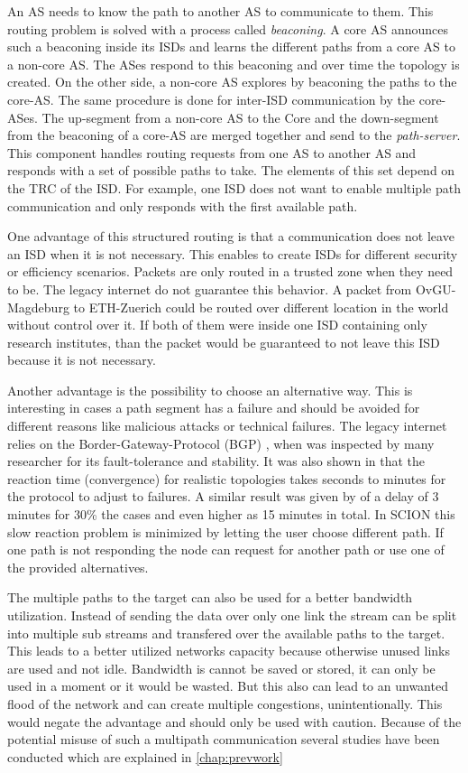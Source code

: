 \documentclass[thesis.tex]{subfiles}
\begin{document}
An AS needs to know the path to another AS to communicate to them. This routing problem is solved with a process called \textit{beaconing}. A core AS announces such a beaconing inside its ISDs and learns the different paths from a core AS to a non-core AS. The ASes respond to this beaconing and over time the topology is created. On the other side, a non-core AS explores by beaconing the paths to the core-AS. The same procedure is done for inter-ISD communication by the core-ASes. The up-segment from a non-core AS to the Core and the down-segment from the beaconing of a core-AS are merged together and send to the \textit{path-server}. This component handles routing requests from one AS to another AS and responds with a set of possible paths to take. The elements of this set depend on the TRC of the ISD. For example, one ISD does not want to enable multiple path communication and only responds with the first available path.

One advantage of this structured routing is that a communication does not leave an ISD when it is not necessary. This enables to create ISDs for different security or efficiency scenarios. Packets are only routed in a trusted zone when they need to be. The legacy internet do not guarantee this behavior. A packet from OvGU-Magdeburg to ETH-Zuerich could be routed over different location in the world without control over it. If both of them were inside one ISD containing only research institutes, than the packet would be guaranteed to not leave this ISD because it is not necessary.

Another advantage is the possibility to choose an alternative way. This is interesting in cases a path segment has a failure and should be avoided for different reasons like malicious attacks or technical failures. The legacy internet relies on the Border-Gateway-Protocol (BGP) \cite{rekhter2005border, Halabi.1997}, when was inspected by many researcher for its fault-tolerance and stability. It was also shown in \cite{Sahoo.2006} that the reaction time (convergence) for realistic topologies takes seconds to minutes for the protocol to adjust to failures. A similar result was given by \cite{Labovitz.2001} of a delay of 3 minutes for 30\% the cases and even higher as 15 minutes in total. In SCION this slow reaction problem is minimized by letting the user choose different path. If one path is not responding the node can request for another path or use one of the provided alternatives.

The multiple paths to the target can also be used for a better bandwidth utilization. Instead of sending the data over only one link the stream can be split into multiple sub streams and transfered over the available paths to the target. 
This leads to a better utilized networks capacity because otherwise unused links are used and not idle. Bandwidth is cannot be saved or stored, it can only be used in a moment or it would be wasted. But this also can lead to an unwanted flood of the network and can create multiple congestions, unintentionally. This would negate the advantage and should only be used with caution. Because of the potential misuse of such a multipath communication several studies have been conducted which are explained in \autoref{chap:prevwork}
\end{document}
